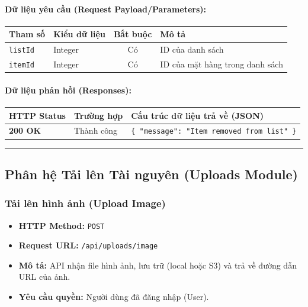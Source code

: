 \documentclass[12pt,a4paper]{article}
\begin{document}
\paragraph{Dữ liệu yêu cầu (Request Payload/Parameters):}
\begin{longtable}{|p{2.8cm}|p{2.2cm}|c|p{7.0cm}|}
\hline
\textbf{Tham số} & \textbf{Kiểu dữ liệu} & \textbf{Bắt buộc} & \textbf{Mô tả} \\ \hline
\endhead
\texttt{listId} & Integer & Có & ID của danh sách \\ \hline
\texttt{itemId} & Integer & Có & ID của mặt hàng trong danh sách \\ \hline
\end{longtable}

\paragraph{Dữ liệu phản hồi (Responses):}
\begin{longtable}{|p{2.8cm}|p{3.2cm}|p{8.0cm}|}
\hline
\textbf{HTTP Status} & \textbf{Trường hợp} & \textbf{Cấu trúc dữ liệu trả về (JSON)} \\ \hline
\endhead
\textbf{200 OK} & Thành công & \texttt{\{ "message": "Item removed from list" \}} \\ \hline
\end{longtable}

\vskip 0.4cm
\noindent\rule{\textwidth}{0.3pt}
\vskip 0.4cm

\subsection{Phân hệ Tải lên Tài nguyên (Uploads Module)}

\subsubsection{Tải lên hình ảnh (Upload Image)}
\begin{itemize}[leftmargin=*]
    \item \textbf{HTTP Method:} \texttt{POST}
    \item \textbf{Request URL:} \texttt{/api/uploads/image}
    \item \textbf{Mô tả:} API nhận file hình ảnh, lưu trữ (local hoặc S3) và trả về đường dẫn URL của ảnh.
    \item \textbf{Yêu cầu quyền:} Người dùng đã đăng nhập (User).
\end{itemize}
\end{document}
